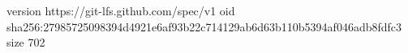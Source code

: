 version https://git-lfs.github.com/spec/v1
oid sha256:27985725098394d4921e6af93b22c714129ab6d63b110b5394af046adb8fdfc3
size 702
